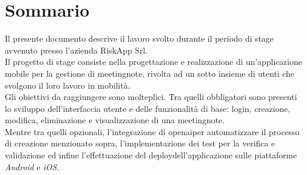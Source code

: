 \cleardoublepage
{}
{}
\begingroup
\let\clearpage\relax
\let\cleardoublepage\relax
\let\cleardoublepage\relax

\chapter*{Sommario}

Il presente documento descrive il lavoro svolto durante il periodo di stage avvenuto presso l'azienda RiskApp Srl. \\

\noindent Il progetto di stage consiste nella progettazione e realizzazione di un'applicazione mobile per la gestione di \gls{meetingnote}\glsoccur, rivolta ad un sotto insieme di utenti che svolgono il loro lavoro in mobilità. \\


\noindent Gli obiettivi da raggiungere sono molteplici. Tra quelli obbligatori sono presenti lo sviluppo dell'interfaccia utente e delle funzionalità di base: login, creazione, modifica, eliminazione e visualizzazione di una \gls{meetingnote}\glsoccur.\\
Mentre tra quelli opzionali, l'integrazione di \gls{openai}\glsoccur per automatizzare il processo di creazione menzionato sopra, l'implementazione dei test per la verifica e validazione ed infine l'effettuazione del \gls{deploy}\glsoccur dell'applicazione sulle piattaforme \emph{Android} e \emph{iOS}.\\




\endgroup

\vfill
